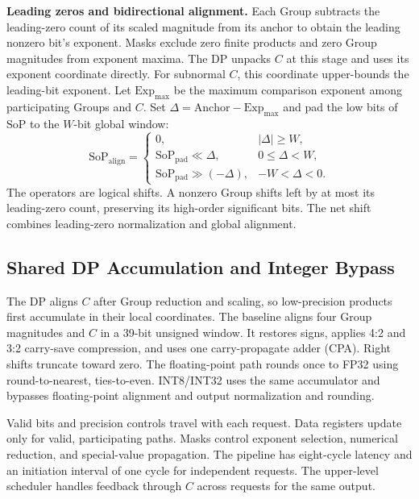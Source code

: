 \documentclass[conference,9pt,letterpaper]{IEEEtran}
\begin{document}
\textbf{Leading zeros and bidirectional alignment.} Each Group subtracts the leading-zero count of its scaled magnitude from its anchor to obtain the leading nonzero bit's exponent. Masks exclude zero finite products and zero Group magnitudes from exponent maxima. The DP unpacks $C$ at this stage and uses its exponent coordinate directly. For subnormal $C$, this coordinate upper-bounds the leading-bit exponent. Let $\mathrm{Exp}_{\mathrm{max}}$ be the maximum comparison exponent among participating Groups and $C$. Set $\Delta=\mathrm{Anchor}-\mathrm{Exp}_{\mathrm{max}}$ and pad the low bits of $\mathrm{SoP}$ to the $W$-bit global window:
\begin{equation}
\mathrm{SoP}_{\mathrm{align}}=
\begin{cases}
0, & |\Delta|\ge W,\\
\mathrm{SoP}_{\mathrm{pad}}\ll\Delta, & 0\le\Delta<W,\\
\mathrm{SoP}_{\mathrm{pad}}\gg(-\Delta), & -W<\Delta<0.
\end{cases}
\label{eq:bidirectional_alignment}
\end{equation}
The operators are logical shifts. A nonzero Group shifts left by at most its leading-zero count, preserving its high-order significant bits. The net shift combines leading-zero normalization and global alignment.

\subsection{Shared DP Accumulation and Integer Bypass}

The DP aligns $C$ after Group reduction and scaling, so low-precision products first accumulate in their local coordinates. The baseline aligns four Group magnitudes and $C$ in a 39-bit unsigned window. It restores signs, applies 4:2 and 3:2 carry-save compression, and uses one carry-propagate adder (CPA). Right shifts truncate toward zero. The floating-point path rounds once to FP32 using round-to-nearest, ties-to-even. INT8/INT32 uses the same accumulator and bypasses floating-point alignment and output normalization and rounding.

Valid bits and precision controls travel with each request. Data registers update only for valid, participating paths. Masks control exponent selection, numerical reduction, and special-value propagation. The pipeline has eight-cycle latency and an initiation interval of one cycle for independent requests. The upper-level scheduler handles feedback through $C$ across requests for the same output.
\end{document}
